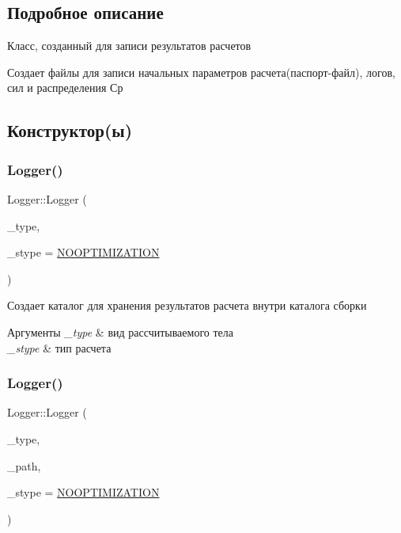 \subsection{Подробное описание}
Класс, созданный для записи результатов расчетов 

Создает файлы для записи начальных параметров расчета(паспорт-\/файл), логов, сил и распределения Ср 

\subsection{Конструктор(ы)}
\mbox{\label{class_logger_a63280558a11dc4f980ee9963c06629b5}} 
\subsubsection{\texorpdfstring{Logger()}{Logger()}\hspace{0.1cm}{\footnotesize\ttfamily [1/2]}}
{\footnotesize\ttfamily Logger\+::\+Logger (\begin{DoxyParamCaption}\item[{\mbox{\hyperlink{bodyfragmentation_8h_acf0ce63e34327e5bc336f9fe3d2d47a2}{Body\+Type}}}]{\+\_\+type,  }\item[{\mbox{\hyperlink{logger_8h_adc24da78894b484d82933fbe4da8edc2}{Solv\+Type}}}]{\+\_\+stype = {\ttfamily \mbox{\hyperlink{logger_8h_adc24da78894b484d82933fbe4da8edc2ae07c32fbcb5eeb8f8b5cc3fea75af13f}{N\+O\+O\+P\+T\+I\+M\+I\+Z\+A\+T\+I\+ON}}} }\end{DoxyParamCaption})}

Создает каталог для хранения результатов расчета внутри каталога сборки 
\begin{DoxyParams}{Аргументы}
{\em \+\_\+type} & вид рассчитываемого тела \\
\hline
{\em \+\_\+stype} & тип расчета \\
\hline
\end{DoxyParams}
\mbox{\label{class_logger_a615b8e52bd4f3b342faece157dcd6117}} 
\subsubsection{\texorpdfstring{Logger()}{Logger()}\hspace{0.1cm}{\footnotesize\ttfamily [2/2]}}
{\footnotesize\ttfamily Logger\+::\+Logger (\begin{DoxyParamCaption}\item[{\mbox{\hyperlink{bodyfragmentation_8h_acf0ce63e34327e5bc336f9fe3d2d47a2}{Body\+Type}}}]{\+\_\+type,  }\item[{Q\+String}]{\+\_\+path,  }\item[{\mbox{\hyperlink{logger_8h_adc24da78894b484d82933fbe4da8edc2}{Solv\+Type}}}]{\+\_\+stype = {\ttfamily \mbox{\hyperlink{logger_8h_adc24da78894b484d82933fbe4da8edc2ae07c32fbcb5eeb8f8b5cc3fea75af13f}{N\+O\+O\+P\+T\+I\+M\+I\+Z\+A\+T\+I\+ON}}} }\end{DoxyParamCaption})}

